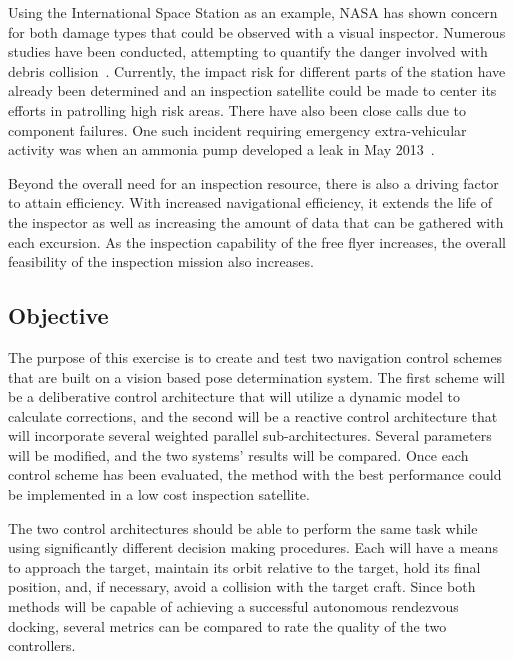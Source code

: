 \documentclass[journal, 10pt]{IEEEtran}
\begin{document}
Using the International Space Station as an example, NASA has shown concern for both damage types that could be observed with a visual inspector.  Numerous studies have been conducted, attempting to quantify the danger involved with debris collision~\cite{Risk}.  Currently, the impact risk for different parts of the station have already been determined and an inspection satellite could be made to center its efforts in patrolling high risk areas.  There have also been close calls due to component failures.  One such incident requiring emergency extra-vehicular activity was when an ammonia pump developed a leak in May 2013~\cite{Ammonia}.


Beyond the overall need for an inspection resource, there is also a driving factor to attain efficiency.  With increased navigational efficiency, it extends the life of the inspector as well as increasing the amount of data that can be gathered with each excursion.  As the inspection capability of the free flyer increases, the overall feasibility of the inspection mission also increases.


\subsection{Objective}
The purpose of this exercise is to create and test two navigation control schemes that are built on a vision based pose determination system.  The first scheme will be a deliberative control architecture that will utilize a dynamic model to calculate corrections, and the second will be a reactive control architecture that will incorporate several weighted parallel sub-architectures. Several parameters will be modified, and the two systems' results will be compared. Once each control scheme has been evaluated, the method with the best performance could be implemented in a low cost inspection satellite.

The two control architectures should be able to perform the same task while using significantly different decision making procedures.  Each will have a means to approach the target, maintain its orbit relative to the target, hold its final position, and, if necessary, avoid a collision with the target craft.  Since both methods will be capable of achieving a successful autonomous rendezvous docking, several metrics can be compared to rate the quality of the two controllers.
\end{document}
